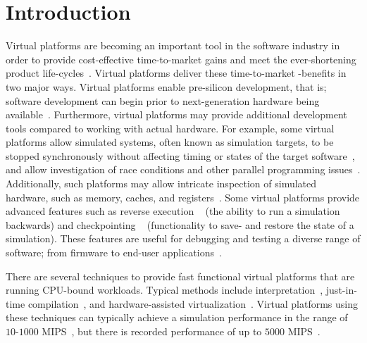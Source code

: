 
\section{Introduction}
\label{sec:introduction}
Virtual platforms are becoming an important tool in the software industry in order to provide cost-effective time-to-market gains and meet the ever-shortening product life-cycles~.
Virtual platforms deliver these time-to-market -benefits in two major ways.
Virtual platforms enable pre-silicon development, that is; software development can begin prior to next-generation hardware being available~.
Furthermore, virtual platforms may provide additional development tools compared to working with actual hardware.
For example, some virtual platforms allow simulated systems, often known as simulation targets, to be stopped synchronously without affecting timing or states of the target software~, and allow investigation of race conditions and other parallel programming issues~.
Additionally, such platforms may allow intricate inspection of simulated hardware, such as memory, caches, and registers~.
Some virtual platforms provide advanced features such as reverse execution ~ (the ability to run a simulation backwards) and checkpointing ~ (functionality to save- and restore the state of a simulation).
These features are useful for debugging and testing a diverse range of software; from firmware to end-user applications~.

There are several techniques to provide fast functional virtual platforms that are running CPU-bound workloads.
Typical methods include interpretation~, just-in-time compilation~, and hardware-assisted virtualization~.
Virtual platforms using these techniques can typically achieve a simulation performance in the range of $10$-$1000$ MIPS~, but there is recorded performance of up to $5000$ MIPS~.

